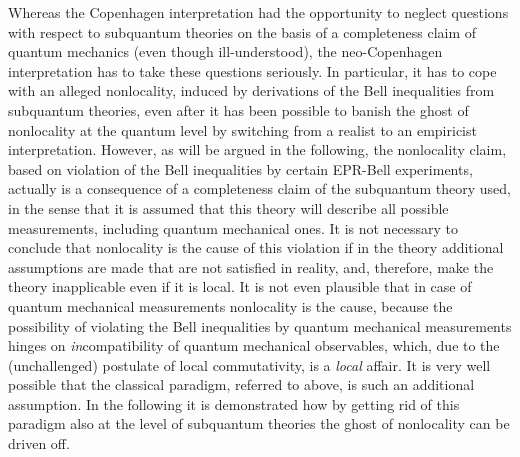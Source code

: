 \documentclass[12pt]{article}
\begin{document}
Whereas the Copenhagen interpretation had the opportunity to
neglect questions with respect to subquantum theories on the basis
of a completeness claim of quantum mechanics (even though
ill-understood), the neo-Copenhagen interpretation has to take
these questions seriously. In particular, it has to cope with an
alleged nonlocality, induced by derivations of the Bell
inequalities from subquantum theories, even after it has been
possible to banish the ghost of nonlocality at the quantum level
by switching from a realist to an empiricist interpretation.
However, as will be argued in the following, the nonlocality
claim, based on violation of the Bell inequalities by certain
EPR-Bell experiments, actually is a consequence of a completeness
claim of the subquantum theory used, in the sense that it is
assumed that this theory will describe all possible measurements,
including quantum mechanical ones. It is not necessary to conclude
that nonlocality is the cause of this violation if in the theory
additional assumptions are made that are not satisfied in reality,
and, therefore, make the theory inapplicable even if it is local.
It is not even plausible that in case of quantum mechanical
measurements nonlocality is the cause, because the possibility of
violating the Bell inequalities by quantum mechanical measurements
hinges on {\em in}compatibility of quantum mechanical observables,
which, due to the (unchallenged) postulate of local commutativity,
is a {\em local} affair. It is very well possible that the
classical paradigm, referred to above, is such an additional
assumption. In the following it is demonstrated how by getting rid
of this paradigm also at the level of subquantum theories the
ghost of nonlocality can be driven off.
\end{document}
